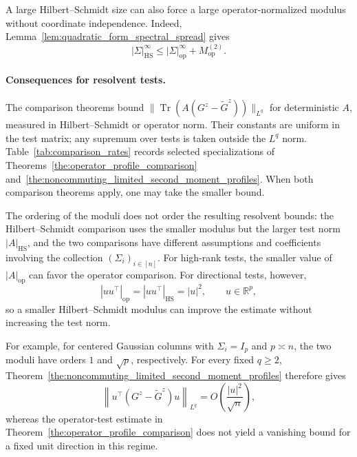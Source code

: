 \documentclass[EJP, preprint, NODS, nobera, nofontexpansion]{ejpecp}
\DeclareMathOperator{\op}{op}
\DeclareMathOperator{\tr}{Tr}
\DeclareMathOperator{\hs}{HS}
\begin{document}
A large Hilbert--Schmidt size can also force a large
operator-normalized modulus without coordinate independence.
Indeed, Lemma~\ref{lem:quadratic_form_spectral_spread} gives
\[
    |\Sigma|_{\hs}^\infty
    \leq |\Sigma|_{\op}^\infty+M_{\op}^{(2)}.
\]

\paragraph{Consequences for resolvent tests.}
The comparison theorems bound
$\|\tr(A(G^z-\tilde G^z))\|_{L^q}$ for deterministic $A$, measured
in Hilbert--Schmidt or operator norm. Their constants are uniform
in the test matrix; any supremum over tests is taken outside the
$L^q$ norm.
Table~\ref{tab:comparison_rates} records selected specializations of Theorems~\ref{the:operator_profile_comparison} and~\ref{the:noncommuting_limited_second_moment_profiles}. When both comparison theorems apply, one may take the smaller bound.



The ordering of the moduli does not order the resulting resolvent
bounds: the Hilbert--Schmidt comparison uses the smaller modulus
but the larger test norm $|A|_{\hs}$, and the two comparisons have
different assumptions and coefficients involving the collection
$(\Sigma_i)_{i\in[n]}$. For high-rank tests, the smaller value of $|A|_{\op}$
can favor the operator comparison. For directional tests, however,
\[
    |uu^\top|_{\op}=|uu^\top|_{\hs}=|u|^2,
    \qquad u\in\mathbb R^p,
\]
so a smaller Hilbert--Schmidt modulus can improve the estimate
without increasing the test norm.

For example, for centered Gaussian columns with $\Sigma_i=I_p$
and $p\asymp n$, the two moduli have orders $1$ and $\sqrt p$,
respectively. For every fixed $q\geq2$,
Theorem~\ref{the:noncommuting_limited_second_moment_profiles}
therefore gives
\[
    \left\|u^\top(G^z-\tilde G^z)u\right\|_{L^q}
    =O\!\left(\frac{|u|^2}{\sqrt n}\right),
\]
whereas the operator-test estimate in
Theorem~\ref{the:operator_profile_comparison} does not yield
a vanishing bound for a fixed unit direction in this regime.
\end{document}
